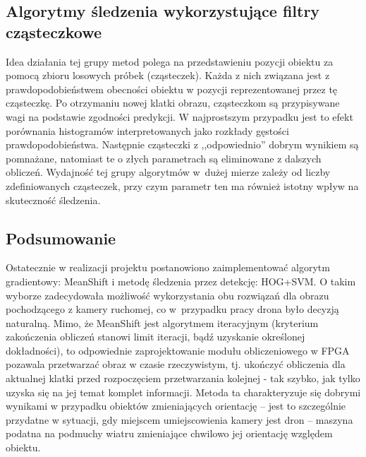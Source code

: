 \subsection{Algorytmy śledzenia wykorzystujące filtry cząsteczkowe}

Idea działania tej grupy metod polega na przedstawieniu pozycji obiektu za pomocą zbioru losowych próbek (cząsteczek). 
Każda z nich związana jest z prawdopodobieństwem obecności obiektu w pozycji reprezentowanej przez tę cząsteczkę. 
Po otrzymaniu nowej klatki obrazu, cząsteczkom są przypisywane wagi na podstawie zgodności predykcji. W najprostszym przypadku jest to efekt porównania histogramów interpretowanych jako rozkłady gęstości prawdopodobieństwa. %
Następnie cząsteczki z ,,odpowiednio'' dobrym wynikiem są pomnażane, natomiast te o złych parametrach są eliminowane z dalszych obliczeń.
Wydajność tej grupy algorytmów w~dużej mierze zależy od liczby zdefiniowanych cząsteczek, przy czym parametr ten ma również istotny wpływ na skuteczność śledzenia.

\subsection{Podsumowanie}

Ostatecznie w realizacji projektu postanowiono zaimplementować algorytm gradientowy: MeanShift i metodę śledzenia przez detekcję: HOG+SVM.
O takim wyborze zadecydowała możliwość wykorzystania obu rozwiązań dla obrazu pochodzącego z kamery ruchomej, co w~przypadku pracy drona było decyzją naturalną. 
Mimo, że MeanShift jest algorytmem iteracyjnym (kryterium zakończenia obliczeń stanowi limit iteracji, bądź uzyskanie określonej dokładności), to odpowiednie zaprojektowanie modułu obliczeniowego w FPGA pozawala przetwarzać obraz w czasie rzeczywistym, tj. ukończyć obliczenia dla aktualnej klatki przed rozpoczęciem przetwarzania kolejnej - tak szybko, jak tylko uzyska się na jej temat komplet informacji. 
Metoda ta charakteryzuje się dobrymi wynikami w przypadku obiektów zmieniających orientację -- jest to szczególnie przydatne w sytuacji, gdy miejscem umiejscowienia kamery jest dron -- maszyna podatna na podmuchy wiatru zmieniające chwilowo jej orientację względem obiektu. 

